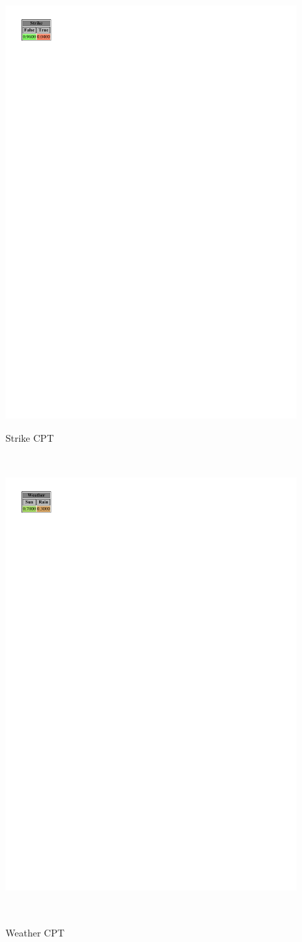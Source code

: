 \documentclass[a4paper,12pt]{article} %
\begin{document}
\begin{figure}[H]
	\begin{center}	
	\begin{minipage}[c]{.3\textwidth}
		\centering
		\includegraphics[width=.5\linewidth]{../code/strike.pdf}	
		\caption*{Strike CPT}
		\label{fig:strike}
	\end{minipage}
	~
	\begin{minipage}[c]{.3\textwidth}
		\centering
		\includegraphics[width=.5\linewidth]{../code/weather.pdf}	
		\caption*{Weather CPT}
		\label{fig:weather}
	\end{minipage}
	~
	\begin{minipage}[c]{.3\textwidth}
		\centering

\end{minipage}
\end{center}
\end{figure}
\end{document}
